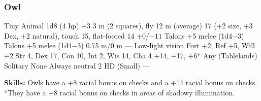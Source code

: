 \subsubsection{Owl}
\begin{MonsterStats}
{Tiny Animal}
{1d8 (4 hp)}
{+3}
{3 m (2 squares), fly 12 m (average)}
{17 (+2 size, +3 Dex, +2 natural), touch 15, flat-footed 14}
{+0/$-11$}
{Talons +5 melee (1d4$-3$)}
{Talons +5 melee (1d4$-3$)}
{0.75 m/0 m}
{---}
{Low-light vision}
{Fort +2, Ref +5, Will +2}
{Str 4, Dex 17, Con 10, Int 2, Wis 14, Cha 4}
{ +14,  +17,  +6*}
{}
{Any (Tablelands)}
{Solitary}
{\onequarter}
{None}
{Always neutral}
{2 HD (Small)}
{---}
\end{MonsterStats}

\textbf{Skills:} Owls have a +8 racial bonus on  checks and a +14 racial bonus on  checks. *They have a +8 racial bonus on  checks in areas of shadowy illumination.

